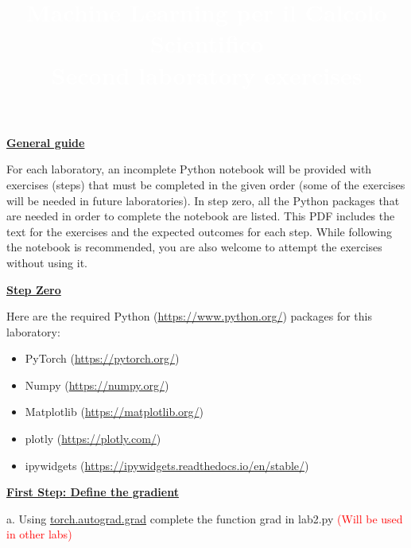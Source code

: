 \documentclass{article}
\title{\textcolor{white}{\textbf{Machine Learning per il Calcolo Scientifico}\\ \small\textbf{Second laboratory exercises }}}
\date{}
\newcommand{\step}[1]{\underline{\textbf{\large{#1}}} }
\begin{document}
    
    \AddToShipoutPicture*
    {%
      \AtPageUpperLeft
        {%
          \color{bluunipv}%
          \raisebox{-.1\paperheight}{\rule{\paperwidth}{.5\paperheight}}%

        }%
    }
    \maketitle
    \begin{center}\step{General guide} \end{center}

    For each laboratory, an incomplete Python notebook will be provided with exercises (steps) that must be completed in the given order (some of the exercises will be needed in future laboratories). In step zero, all the Python packages that are needed in order to complete the notebook are listed. This PDF includes the text for the exercises and the expected outcomes for each step. While following the notebook is recommended, you are also welcome to attempt the exercises without using it.


    \begin{center}\step{Step Zero} \end{center}

    Here are the required Python (\url{https://www.python.org/}) packages for this laboratory:

    \begin{itemize}
      \item PyTorch (\url{https://pytorch.org/})
      \item Numpy (\url{https://numpy.org/})
      \item Matplotlib (\url{https://matplotlib.org/})
      \item[\textcolor{red}{\textbullet}] plotly (\url{https://plotly.com/})
      \item[\textcolor{red}{\textbullet}] ipywidgets (\url{https://ipywidgets.readthedocs.io/en/stable/})
    \end{itemize}


    \begin{center}\step{First Step: Define the gradient}\end{center}

    a. Using \href{https://pytorch.org/docs/stable/generated/torch.autograd.grad.html}{torch.autograd.grad} complete the function grad in lab2.py \textcolor{red}{(Will be used in other labs)} 
    
\end{document}
